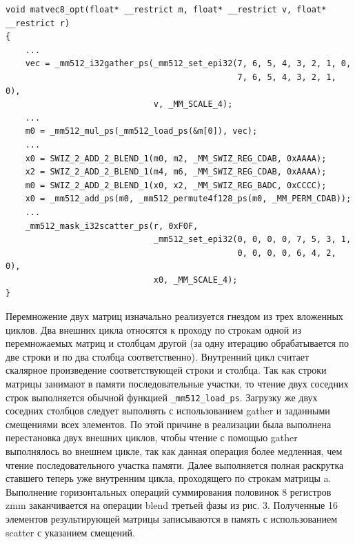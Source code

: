 \begin{lstlisting}[caption={caption}, label={label}]
void matvec8_opt(float* __restrict m, float* __restrict v, float* __restrict r)
{
    ...
    vec = _mm512_i32gather_ps(_mm512_set_epi32(7, 6, 5, 4, 3, 2, 1, 0,
                                               7, 6, 5, 4, 3, 2, 1, 0),
                              v, _MM_SCALE_4);
    ...
    m0 = _mm512_mul_ps(_mm512_load_ps(&m[0]), vec);
    ...
    x0 = SWIZ_2_ADD_2_BLEND_1(m0, m2, _MM_SWIZ_REG_CDAB, 0xAAAA);
    x2 = SWIZ_2_ADD_2_BLEND_1(m4, m6, _MM_SWIZ_REG_CDAB, 0xAAAA);
    m0 = SWIZ_2_ADD_2_BLEND_1(x0, x2, _MM_SWIZ_REG_BADC, 0xCCCC);
    x0 = _mm512_add_ps(m0, _mm512_permute4f128_ps(m0, _MM_PERM_CDAB));
    ...
    _mm512_mask_i32scatter_ps(r, 0xF0F,
                              _mm512_set_epi32(0, 0, 0, 0, 7, 5, 3, 1,
                                               0, 0, 0, 0, 6, 4, 2, 0),
                              x0, _MM_SCALE_4);
}
\end{lstlisting}

Перемножение двух матриц изначально реализуется гнездом из трех вложенных циклов.
Два внешних цикла относятся к проходу по строкам одной из перемножаемых матриц и столбцам другой (за одну итерацию обрабатывается по две строки и по два столбца соответственно).
Внутренний цикл считает скалярное произведение соответствующей строки и столбца.
Так как строки матрицы занимают в памяти последовательные участки, то чтение двух соседних строк выполняется обычной функцией \texttt{\_mm512\_load\_ps}.
Загрузку же двух соседних столбцов следует выполнять с использованием gather и заданными смещениями всех элементов.
По этой причине в реализации была выполнена перестановка двух внешних циклов, чтобы чтение с помощью gather выполнялось во внешнем цикле, так как данная операция более медленная, чем чтение последовательного участка памяти.
Далее выполняется полная раскрутка ставшего теперь уже внутренним цикла, проходящего по строкам матрицы a.
Выполнение горизонтальных операций суммирования половинок 8 регистров zmm заканчивается на операции blend третьей фазы из рис. 3.
Полученные 16 элементов результирующей матрицы записываются в память с использованием scatter с указанием смещений.

